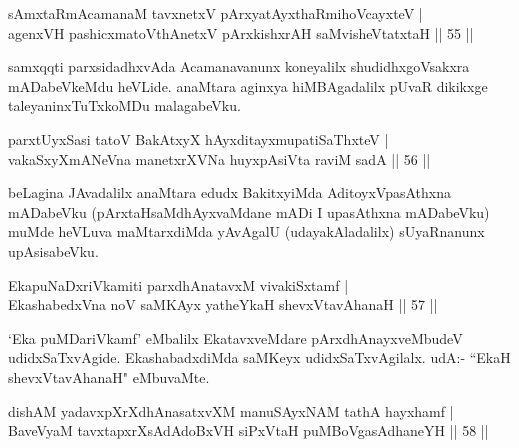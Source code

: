 
\begin{shl}
sAmxtaRmAcamanaM tavxnetxV pArxyatAyxthaRmihoVcayxteV | \\
agenxVH pashicxmatoV\s thAnetxV pArxkishxrAH saMvisheVtatxtaH \hfill|| 55 || 
\end{shl}

\begin{artha}
samxqqti parxsidadhxvAda Acamanavanunx koneyalilx shudidhxgoVsakxra 
mADabeVkeMdu heVLide. anaMtara aginxya hiMBAgadalilx pUvaR dikikxge 
taleyaninxTuTxkoMDu malagabeVku.
\end{artha}


\begin{shl}
parxtUyxSasi tatoV BakAtxyX hAyxditayxmupatiSaThxteV | \\
vakaSxyXmANeVna manetxrXVNa huyxpAsiVta raviM sadA \hfill|| 56 || 
\end{shl}

\begin{artha}
beLagina JAvadalilx anaMtara edudx BakitxyiMda AditoyxVpasAthxna 
mADabeVku (pArxtaHsaMdhAyxvaMdane mADi I upasAthxna mADabeVku) muMde 
heVLuva maMtarxdiMda yAvAgalU (udayakAladalilx) sUyaRnanunx 
upAsisabeVku.
\end{artha}


\begin{shl}
EkapuNaDxriVkamiti parxdhAnatavxM vivakiSxtamf | \\
EkashabedxVna noV saMKAyx yatheYkaH shevxVtavAhanaH \hfill|| 57 || 
\end{shl}

\begin{artha}
`Eka puMDariVkamf' eMbalilx EkatavxveMdare pArxdhAnayxveMbudeV 
udidxSaTxvAgide. EkashabadxdiMda saMKeyx udidxSaTxvAgilalx. udA:- 
``EkaH shevxVtavAhanaH" eMbuvaMte.
\end{artha}


\begin{shl}
dishAM yadavxpXrXdhAnasatxvXM manuSAyxNAM tathA hayxhamf | \\
BaveVyaM tavxtapxrXsAdAdoBxVH siPxVtaH puMBoVgasAdhaneYH \hfill|| 58 || 
\end{shl}

